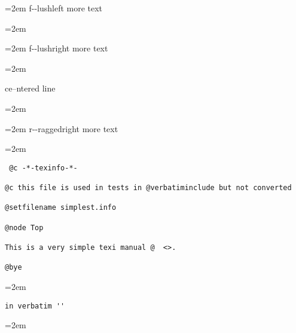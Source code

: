\documentclass{book}
\begin{document}
\endgroup{}%
\par\begingroup\obeylines\obeyspaces\frenchspacing\leftskip=2em\relax\parskip=0pt\relax\ttfamily{}%
f{-}{-}lushleft
more text
\endgroup{}%
\par\begingroup\obeylines\obeyspaces\frenchspacing\leftskip=2em\relax\parskip=0pt\relax\ttfamily{}%

\endgroup{}%
\par\begingroup\obeylines\obeyspaces\frenchspacing\leftskip=2em\relax\parskip=0pt\relax\ttfamily{}%
f{-}{-}lushright
more text
\endgroup{}%
\par\begingroup\obeylines\obeyspaces\frenchspacing\leftskip=2em\relax\parskip=0pt\relax\ttfamily{}%

\endgroup{}%
\begin{center}
ce--ntered line
\end{center}
\par\begingroup\obeylines\obeyspaces\frenchspacing\leftskip=2em\relax\parskip=0pt\relax\ttfamily{}%

\endgroup{}%
\begin{flushleft}
\par\begingroup\obeylines\obeyspaces\frenchspacing\leftskip=2em\relax\parskip=0pt\relax\ttfamily{}%
r{-}{-}raggedright
more text
\endgroup{}%
\end{flushleft}
\par\begingroup\obeylines\obeyspaces\frenchspacing\leftskip=2em\relax\parskip=0pt\relax\ttfamily{}%

\endgroup{}%
\begin{verbatim}
 @c -*-texinfo-*-

@c this file is used in tests in @verbatiminclude but not converted

@setfilename simplest.info

@node Top

This is a very simple texi manual @  <>.

@bye
\end{verbatim}
\par\begingroup\obeylines\obeyspaces\frenchspacing\leftskip=2em\relax\parskip=0pt\relax\ttfamily{}%

\endgroup{}%
\begin{verbatim}
in verbatim ''
\end{verbatim}
\par\begingroup\obeylines\obeyspaces\frenchspacing\leftskip=2em\relax\parskip=0pt\relax\ttfamily{}%
\end{document}
